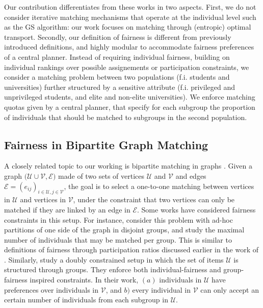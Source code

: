\documentclass{article}
\theoremstyle{definition}
\begin{document}
Our contribution differentiates from these works in two aspects. First, we do not consider iterative matching mechanisms that operate at the individual level such as the GS algorithm: our work focuses on matching through (entropic) optimal transport. Secondly, our definition of fairness is different from previously introduced definitions, and highly modular to accommodate fairness preferences of a central planner. Instead of requiring individual fairness, building on individual rankings over possible assignements or participation constraints, we consider a matching problem between two populations (f.i. students and universities) further structured by a sensitive attribute (f.i. privileged and unprivileged students, and elite and non-elite universities). We enforce matching quotas given by a central planner, that specify for each subgroup the proportion of individuals that should be matched to subgroups in the second population.  

\subsection{Fairness in Bipartite Graph Matching}
A closely related topic to our working is bipartite matching in graphs \citep{godsil1981matchings,zdeborova2006number,noiry2021online}. Given a graph $\big(\mathcal{U}\cup \mathcal{V},\mathcal{E}\big)$ made of two sets of vertices $\mathcal{U}$ and $\mathcal{V}$ and edges $\mathcal{E}=(e_{ij})_{i \in \mathcal{U},j\in\mathcal{V}}$, the goal is to select a one-to-one matching between vertices in $\mathcal{U}$ and vertices in $\mathcal{V}$, under the constraint that two vertices can only be matched if they are linked by an edge in $\mathcal{E}$. Some works have considered fairness constraints in this setup. For instance, \citet{castera2026price} consider this problem with ad-hoc partitions of one side of the graph in disjoint groups, and study the maximal number of individuals that may be matched per group. This is similar to definitions of fairness through participation ratios discussed earlier in the work of \citet{zhang2025fairness}. Similarly, \citet{panda2024individual} study a doubly constrained setup in which the set of items $\mathcal{U}$ is structured through groups. They enforce both individual-fairness and group-fairness inspired constraints. In their work, $(a)$ individuals in $\mathcal{U}$ have preferences over individuals in $\mathcal V$, and $b)$ every individual in $\mathcal{V}$ can only accept an certain number of individuals from each subgroup in $\mathcal{U}$.
\end{document}
